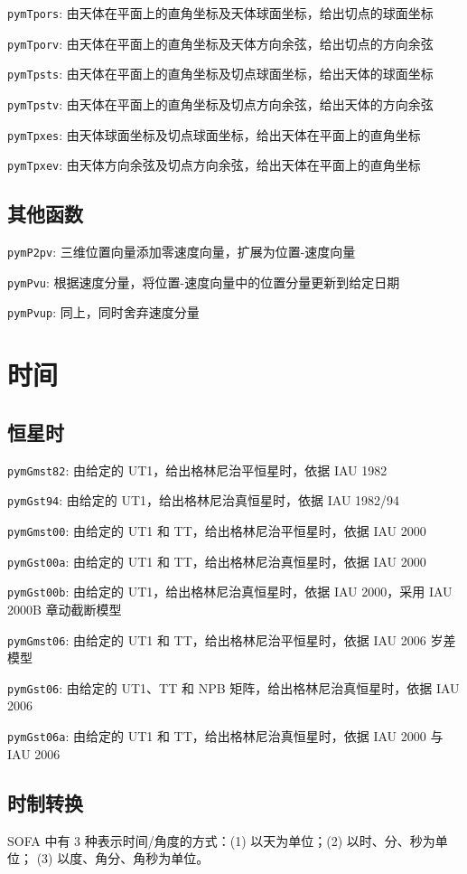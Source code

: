 \documentclass[11pt]{article}
\begin{document}
\texttt{pymTpors}: 由天体在平面上的直角坐标及天体球面坐标，给出切点的球面坐标

\texttt{pymTporv}: 由天体在平面上的直角坐标及天体方向余弦，给出切点的方向余弦

\texttt{pymTpsts}: 由天体在平面上的直角坐标及切点球面坐标，给出天体的球面坐标

\texttt{pymTpstv}: 由天体在平面上的直角坐标及切点方向余弦，给出天体的方向余弦

\texttt{pymTpxes}: 由天体球面坐标及切点球面坐标，给出天体在平面上的直角坐标

\texttt{pymTpxev}: 由天体方向余弦及切点方向余弦，给出天体在平面上的直角坐标

\subsection{其他函数}
\texttt{pymP2pv}: 三维位置向量添加零速度向量，扩展为位置-速度向量

\texttt{pymPvu}: 根据速度分量，将位置-速度向量中的位置分量更新到给定日期

\texttt{pymPvup}: 同上，同时舍弃速度分量

\newpage
\section{时间}

\subsection{恒星时}
\texttt{pymGmst82}: 由给定的 UT1，给出格林尼治平恒星时，依据 IAU 1982

\texttt{pymGst94}: 由给定的 UT1，给出格林尼治真恒星时，依据 IAU 1982/94

\texttt{pymGmst00}: 由给定的 UT1 和 TT，给出格林尼治平恒星时，依据 IAU 2000

\texttt{pymGst00a}: 由给定的 UT1 和 TT，给出格林尼治真恒星时，依据 IAU 2000

\texttt{pymGst00b}: 由给定的 UT1，给出格林尼治真恒星时，依据 IAU 2000，采用 IAU 2000B 章动截断模型

\texttt{pymGmst06}: 由给定的 UT1 和 TT，给出格林尼治平恒星时，依据 IAU 2006 岁差模型

\texttt{pymGst06}: 由给定的 UT1、TT 和 NPB 矩阵，给出格林尼治真恒星时，依据 IAU 2006

\texttt{pymGst06a}: 由给定的 UT1 和 TT，给出格林尼治真恒星时，依据 IAU 2000 与 IAU 2006

\subsection{时制转换}
SOFA 中有 3 种表示时间/角度的方式：(1) 以天为单位；(2) 以时、分、秒为单位；
(3) 以度、角分、角秒为单位。
\end{document}

